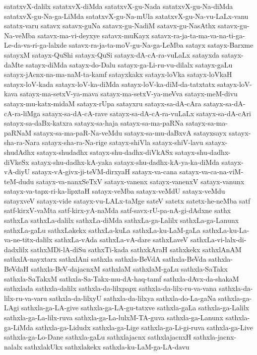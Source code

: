 {satatxvX-dalilx
satatxvX-diMda
satatxvX-gu-Nada
satatxvX-gu-Na-diMda
satatxvX-gu-Na-ga-LiMda
satatxvX-gu-Na-mUla
satatxvX-gu-Na-vu-LaLx-vanu
satatx-varu
satavx
satavx-guNa
satavx-gu-NadiM
satavx-gu-NasAthx
satavx-gu-Na-veMba
satavx-ma-vi-deyxye
satavx-muKayx
satavx-ra-ja-ta-ma-va-na-ti-ga-Le-da-va-ri-ga-lalxde
satavx-ra-ja-ta-moV-gu-Na-ga-LeMba
satayx
satayx-Barxme
satayxM
satayx-QuShi
satayx-QuSi
satayx-dA-cA-ra-vuLaLx
satayxda
satayx-daMte
satayx-diMda
satayx-do-Dalu
satayx-ga-Li-ru-vu-dilalx
satayx-gaLu
satayx-jAcnx-na-ma-naM-ta-kamf
satayxkakx
satayx-loVka
satayx-loVkaH
satayx-loV-kada
satayx-loV-ka-diMda
satayx-loV-ka-diM-da-tatxtatx
satayx-loV-kava
satayx-ma-setxV-ya-mava
satayx-ma-setxV-ya-meVva
satayx-meM-divu
satayx-mu-katx-midaM
satayx-rUpa
satayxru
satayx-sa-dA-cAra
satayx-sa-dA-cA-ra-liMga
satayx-sa-dA-cA-rave
satayx-sa-dA-cA-ra-vuLaLx
satayx-sa-dA-cAri
satayx-sa-daBx-katxra
satayx-sa-haja
satayx-sa-ma-paRNa
satayx-sa-ma-paRNaM
satayx-sa-ma-paR-Na-veMdu
satayx-sa-mu-daBxvA
satayxsayx
satayx-sha-ra-Nara
satayx-sha-ra-Na-rige
satayx-shiVla
satayx-shiV-lavu
satayx-shudAdhx
satayx-shudadhx
satayx-shu-dadhx-diVkASx
satayx-shu-dadhx-diVkeSx
satayx-shu-dadhx-kA-yaka
satayx-shu-dadhx-kA-ya-ka-diMda
satayx-vA-diyU
satayx-vA-givx-ji-teVM-dirxyaH
satayx-va-cana
satayx-va-ca-na-viM-teM-dudu
satayx-va-nanxSeTxV
satayx-vanenx
satayx-vanenxV
satayx-vanunx
satayx-va-tapx-ri-ka-lipxtaH
satayx-veMba
satayx-veMdU
satayx-veMdu
satayxveV
satayx-vide
satayx-vu-LALx-taMge
sateV
satetx
satetx-he-neMba
satf
satf-kirxV-vaMta
satf-kirx-yA-naMda
satf-savx-rU-pa-nA-gi-dAdxne
sathx
sathxLa
sathxLa-dalilx
sathxLa-diMda
sathxLa-ga-Lalilx
sathxLa-ga-Lanunx
sathxLa-gaLu
sathxLakekx
sathxLa-kuLa
sathxLa-ku-LaM-gaLa
sathxLa-ku-La-va-ne-titx-dalilx
sathxLa-vAda
sathxLa-vA-dare
sathxLaveV
sathxLa-vi-lalx-di-dadxlilx
sathxMDi-lA-diSu
sathxTi-kada
sathxkAraH
sathxkekx
sathxlAnAM
sathxlA-nayxtarx
sathxlAni
sathxla
sathxla-BeVdA
sathxla-BeVda
sathxla-BeVdaH
sathxla-BeV-dajacnxM
sathxlaM
sathxlaM-gaLu
sathxla-SaTakx
sathxla-SaTakxM
sathxla-Sa-Takx-mu-dA-haq-tamf
sathxla-dAvx-da-shakaM
sathxlada
sathxla-dalilx
sathxla-da-lilxpapx
sathxla-da-lilx-ru-va-vana
sathxla-da-lilx-ru-va-varu
sathxla-da-lilxyU
sathxla-da-lilxya
sathxla-do-La-gaNa
sathxla-ga-LAgi
sathxla-ga-LA-give
sathxla-ga-LA-gu-tatxve
sathxla-gaLa
sathxla-ga-Lalilx
sathxla-ga-La-lilx-ruva
sathxla-ga-La-lulxM-TA-guva
sathxla-ga-Lanunx
sathxla-ga-LiMda
sathxla-ga-Lidudx
sathxla-ga-Lige
sathxla-ga-Li-gi-ruva
sathxla-ga-Live
sathxla-ga-Lo-Dane
sathxla-gaLu
sathxlajacnx
sathxlajacnxH
sathxla-jacnx-nalalx
sathxlakUkx
sathxlakekx
sathxla-ku-LaM-ga-LA-davu
}
